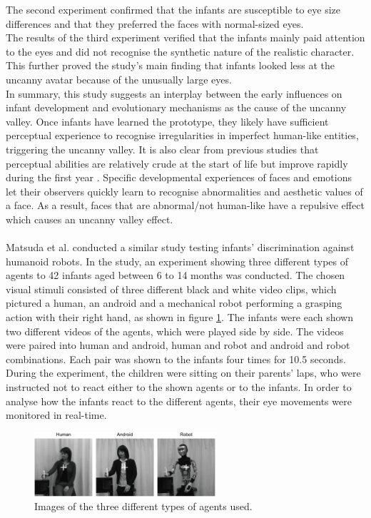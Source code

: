 The second experiment confirmed that the infants are susceptible to eye size differences and that they preferred the faces with normal-sized eyes.\\
The results of the third experiment verified that the infants mainly paid attention to the eyes and did not recognise the synthetic nature of the realistic character. This further proved the study's main finding that infants looked less at the uncanny avatar because of the unusually large eyes.\\
In summary, this study suggests an interplay between the early influences on infant development and evolutionary mechanisms as the cause of the uncanny valley. Once infants have learned the prototype, they likely have sufficient perceptual experience to recognise irregularities in imperfect human-like entities, triggering the uncanny valley. It is also clear from previous studies that perceptual abilities are relatively crude at the start of life but improve rapidly during the first year \cite{Lewkowicz2009_perceptual_abilities,Pascalis2009_perceptual_abilities}. Specific developmental experiences of faces and emotions let their observers quickly learn to recognise abnormalities and aesthetic values of a face. As a result, faces that are abnormal/not human-like have a repulsive effect which causes an uncanny valley effect.\\\\
Matsuda et al. \cite{uncanny_infant_discrimination} conducted a similar study testing infants' discrimination against humanoid robots. In the study, an experiment showing three different types of agents to 42 infants aged between 6 to 14 months was conducted. The chosen visual stimuli consisted of three different black and white video clips, which pictured a human, an android and a mechanical robot performing a grasping action with their right hand, as shown in figure \ref{fig:uncannyInfantsDiscrimination}. The infants were each shown two different videos of the agents, which were played side by side. 
\newpage
The videos were paired into human and android, human and robot and android and robot combinations. Each pair was shown to the infants four times for 10.5 seconds. During the experiment, the children were sitting on their parents' laps, who were instructed not to react either to the shown agents or to the infants. In order to analyse how the infants react to the different agents, their eye movements were monitored in real-time.
\begin{figure} %
    \centering
    \includegraphics[width=0.6\textwidth]{graphics/uncanny_infants_discrimination.png}
    \caption{Images of the three different types of agents used.}
    \label{fig:uncannyInfantsDiscrimination}
\end{figure}
